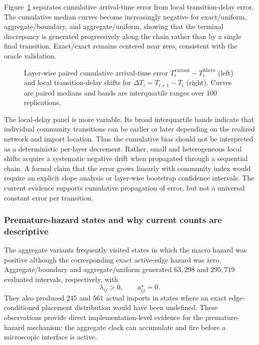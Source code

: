 Figure~\ref{fig:hazard_placement_layerwise} separates cumulative arrival-time error from local transition-delay error.  The cumulative median curves become increasingly negative for exact/uniform, aggregate/boundary, and aggregate/uniform, showing that the terminal discrepancy is generated progressively along the chain rather than by a single final transition.  Exact/exact remains centered near zero, consistent with the oracle validation.

\begin{figure}[t]
    \centering
    \caption{Layer-wise paired cumulative arrival-time error $T_i^{\mathrm{variant}}-T_i^{\mathrm{Micro}}$ (left) and local transition-delay shifts for $\Delta T_i=T_{i+1}-T_i$ (right).  Curves are paired medians and bands are interquartile ranges over $100$ replications.}
    \label{fig:hazard_placement_layerwise}
\end{figure}

The local-delay panel is more variable.  Its broad interquartile bands indicate that individual community transitions can be earlier or later depending on the realized network and import location.  Thus the cumulative bias should not be interpreted as a deterministic per-layer decrement.  Rather, small and heterogeneous local shifts acquire a systematic negative drift when propagated through a sequential chain.  A formal claim that the error grows linearly with community index would require an explicit slope analysis or layer-wise bootstrap confidence intervals.  The current evidence supports cumulative propagation of error, but not a universal constant error per transition.

\subsubsection{Premature-hazard states and why current counts are descriptive}
\label{sec:hazard_placement_premature}

The aggregate variants frequently visited states in which the macro hazard was positive although the corresponding exact active-edge hazard was zero.  Aggregate/boundary and aggregate/uniform generated $63{,}298$ and $295{,}719$ evaluated intervals, respectively, with
\[
\lambda_{ij}>0,
\qquad
a^{\star}_{ij}=0.
\]
They also produced $245$ and $561$ actual imports in states where an exact edge-conditioned placement distribution would have been undefined.  These observations provide direct implementation-level evidence for the premature-hazard mechanism: the aggregate clock can accumulate and fire before a microscopic interface is active.

